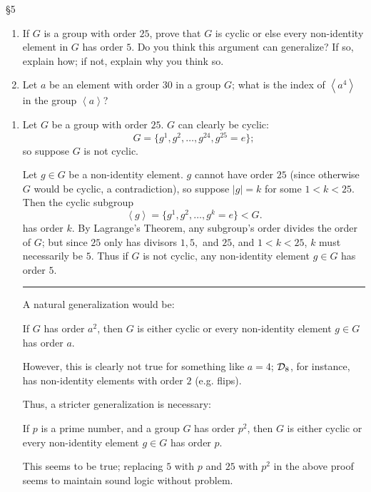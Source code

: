 \documentclass{homework}
\begin{document}
\begin{problem}{\S 5}
  \begin{enumerate}[label=(\alph*)]
    \item If $G$ is a group with order $25$, prove that $G$ is cyclic or else every non-identity
      element in $G$ has order $5$. Do you think this argument can generalize? If so, explain how;
      if not, explain why you think so.
    \item Let $a$ be an element with order $30$ in a group $G$; what is the index of $\left<a^{4}
      \right>$ in the group $\left<a \right>$?
  \end{enumerate}
\end{problem}

\begin{solution}
  \begin{enumerate}[label=(\alph*)]
    \item 
      Let $G$ be a group with order $25$. $G$ can clearly be cyclic: \[
        G=\{ g^{1},g^2,\ldots,g^{24},g^{25}=e \}
      ;\] so suppose $G$ is not cyclic.

      Let $g\in G$ be a non-identity element. $g$ cannot have order $25$ (since otherwise $G$ would be
      cyclic, a contradiction),  so suppose $\left| g \right| =k$ for some $1<k<25$. Then the cyclic
      subgroup \[
        \left<g \right> = \{ g^{1},g^2,\ldots,g^{k}=e \} < G
      .\] has order $k$. By Lagrange's Theorem, any subgroup's order divides the order of $G$; but
      since $25$ only has divisors $1,5,$ and $25$, and $1<k<25$, $k$ must necessarily be $5$. Thus if
      $G$ is not cyclic, any non-identity element $g\in G$ has order $5$.
      \hrule
      A natural generalization would be:
      \begin{center}
        If  $G$ has order $a^2$, then $G$ is either cyclic or every non-identity element $g\in G$ has
        order $a$.
      \end{center}
      However, this is clearly not true for something like $a=4$; $\mathcal{D}_8$, for instance, has
      non-identity elements with order $2$ (e.g. flips).

      Thus, a stricter generalization is necessary:
      \begin{center}
        If $p$ is a prime number, and a group $G$ has order $p^2$, then $G$ is either cyclic or
        every non-identity element $g\in G$ has order $p$.
      \end{center}
      This seems to be true; replacing $5$ with $p$ and $25$ with $p^2$ in the above proof seems to
      maintain sound logic without problem.


\end{enumerate}
\end{solution}
\end{document}
